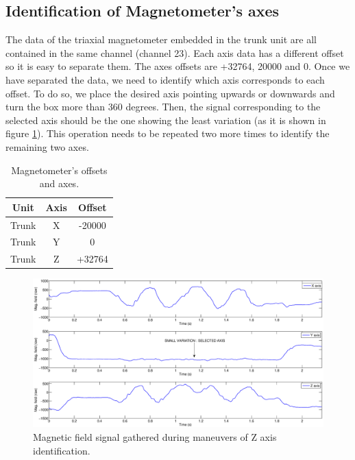 \subsection{Identification of Magnetometer's axes}
\label{subsec:mag_ID}

\indent \indent The data of the triaxial magnetometer embedded in the trunk unit are all contained in the same channel (channel 23). Each axis data has a different offset so it is easy to separate them. The axes offsets are +32764, 20000 and 0. Once we have separated the data, we need to identify which axis corresponds to each offset. To do so, we place the desired axis pointing upwards or downwards and turn the box more than 360 degrees. Then, the signal corresponding to the selected axis should be the one showing the least variation (as it is shown in figure \ref{fig:mag_axis_ID}). This operation needs to be repeated two more times to identify the remaining two axes. 
\begin{table}[H]
\caption{Magnetometer's offsets and axes.}
	\centering
		\begin{tabular}{|c|c|c|}\hline
		\label{tab:mag_offsets}
		Unit		& Axis 	& Offset 	\\ \hline
		Trunk		& X			& -20000				\\ 
		Trunk		& Y			& 0	\\ 
		Trunk		& Z			& +32764	\\ \hline
		\end{tabular}
\end{table}

\begin{figure}[H]
\centering
\includegraphics[width=1\textwidth]{figures/mag_axis_ID.eps}
\caption{Magnetic field signal gathered during maneuvers of Z axis identification.}
\label{fig:mag_axis_ID}
\end{figure}

